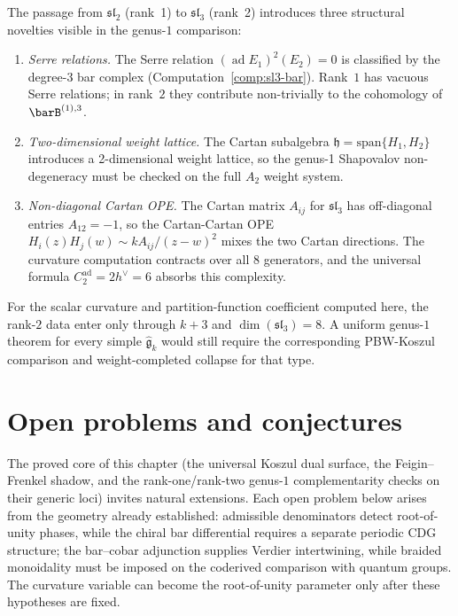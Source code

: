 \begin{remark}\label{rem:sl3-rank2}
The passage from $\mathfrak{sl}_2$ (rank~1) to $\mathfrak{sl}_3$ (rank~2) introduces three structural novelties visible in the genus-$1$ comparison:
\begin{enumerate}
\item \emph{Serre relations.} The Serre relation $(\operatorname{ad} E_1)^2(E_2) = 0$ is classified by the degree-3 bar complex (Computation~\ref{comp:sl3-bar}). Rank~$1$ has vacuous Serre relations; in rank~$2$ they contribute non-trivially to the cohomology of $\barB^{(1),3}$.
\item \emph{Two-dimensional weight lattice.} The Cartan subalgebra $\mathfrak{h} = \mathrm{span}\{H_1, H_2\}$ introduces a 2-dimensional weight lattice, so the genus-1 Shapovalov non-degeneracy must be checked on the full $A_2$ weight system.
\item \emph{Non-diagonal Cartan OPE.} The Cartan matrix $A_{ij}$ for $\mathfrak{sl}_3$ has off-diagonal entries $A_{12} = -1$, so the Cartan-Cartan OPE $H_i(z)H_j(w) \sim kA_{ij}/(z-w)^2$ mixes the two Cartan directions. The curvature computation contracts over all $8$ generators, and the universal formula $C_2^{\mathrm{ad}} = 2h^\vee = 6$ absorbs this complexity.
\end{enumerate}

For the scalar curvature and partition-function coefficient computed
here, the rank-$2$ data enter only through $k+3$ and
$\dim(\mathfrak{sl}_3)=8$.  A uniform genus-$1$ theorem for every simple
$\widehat{\mathfrak{g}}_k$ would still require the corresponding
PBW-Koszul comparison and weight-completed collapse for that type.
\end{remark}

\section{Open problems and conjectures}

The proved core of this chapter (the universal Koszul dual surface, the
Feigin--Frenkel shadow, and the rank-one/rank-two genus-$1$
complementarity checks on their generic loci) invites natural
extensions. Each open problem
below arises from the geometry already established: admissible
denominators detect root-of-unity phases, while the chiral bar
differential requires a separate periodic CDG structure; the
bar--cobar adjunction supplies Verdier intertwining, while braided
monoidality must be imposed on the coderived comparison with quantum
groups. The curvature variable can become the root-of-unity parameter
only after these hypotheses are fixed.

